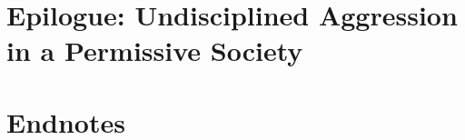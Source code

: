 \documentclass{article}
\numberwithin{equation}{section}
\begin{document}

\section{Epilogue: Undisciplined Aggression in a Permissive Society}


\section{Endnotes}


\printbibliography[heading=bibintoc]
	
\end{document}
